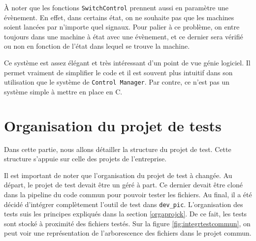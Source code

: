\documentclass[a4paper]{article}
\begin{document}

À noter que les fonctions \verb|SwitchControl| prennent aussi en paramètre une
évènement. En effet, dans certains état, on ne souhaite pas que les machines
soient lancées par n'importe quel signaux. Pour palier à ce problème, on entre
toujours dans une machine à état avec une évènement, et ce dernier sera vérifié
ou non en fonction de l'état dans lequel se trouve la machine.

Ce système est assez élégant et très intéressant d'un point de vue génie
logiciel. Il permet vraiment de simplifier le code et il est souvent plus
intuitif dans son utilisation que le système de \verb|Control Manager|. Par
contre, ce n'est pas un système simple à mettre en place en C.
\section{Organisation du projet de tests}%

Dans cette partie, nous allons détailler la structure du projet de test. Cette
structure s'appuie sur celle des projets de l'entreprise.

Il est important de noter que l'organisation du projet de test à changée. Au
départ, le projet de test devait être un géré à part. Ce dernier devait être
cloné dans la pipeline du code commun pour pouvoir tester les fichiers. Au
final, il a été décidé d'intégrer complètement l'outil de test dans
\verb|dev_pic|. L'organisation des tests suis les principes expliqués dans la
section \ref{orgaprojck}. De ce fait, les tests sont stocké à proximité des
fichiers testés. Sur la figure \ref{fig:integrtestcommun}, on peut voir une
représentation de l'arborescence des fichiers dans le projet commun.

\end{document}
